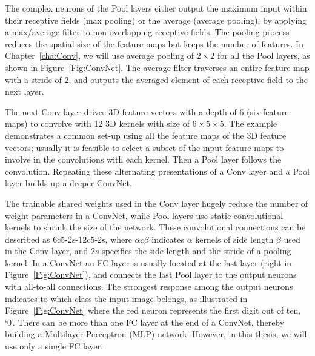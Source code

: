 The complex neurons of the Pool layers either output the maximum input within their receptive fields (max pooling) or the average (average pooling), by applying a max/average filter to non-overlapping receptive fields.
The pooling process reduces the spatial size of the feature maps but keeps the number of features.
In Chapter~\ref{cha:Conv}, we will use average pooling of $2\times2$ for all the Pool layers, as shown in Figure~\ref{Fig:ConvNet}.
The average filter traverses an entire feature map with a stride of 2, and outputs the averaged element of each receptive field to the next layer.

The next Conv layer drives 3D feature vectors with a depth of 6 (six feature maps) to convolve with 12 3D kernels with size of $6\times5\times5$.
The example demonstrates a common set-up using all the feature maps of the 3D feature vectors; usually it is feasible to select a subset of the input feature maps to involve in the convolutions with each kernel.
Then a Pool layer follows the convolution.
Repeating these alternating presentations of a Conv layer and a Pool layer builds up a deeper ConvNet.

The trainable shared weights used in the Conv layer hugely reduce the number of weight parameters in a ConvNet, while Pool layers use static convolutional kernels to shrink the size of the network.
These convolutional connections can be described as 6c5-2s-12c5-2s, where $\alpha c \beta$ indicates $\alpha$ kernels of side length $\beta$ used in the Conv layer, and $2s$ specifies the side length and the stride of a pooling kernel.
In a ConvNet an FC layer is usually located at the last layer (right in Figure~\ref{Fig:ConvNet}), and connects the last Pool layer to the output neurons with all-to-all connections.
The strongest response among the output neurons indicates to which class the input image belongs, as illustrated in Figure~\ref{Fig:ConvNet} where the red neuron represents the first digit out of ten, `0'.
There can be more than one FC layer at the end of a ConvNet, thereby building a Multilayer Perceptron (MLP) network.
However, in this thesis, we will use only a single FC layer.



